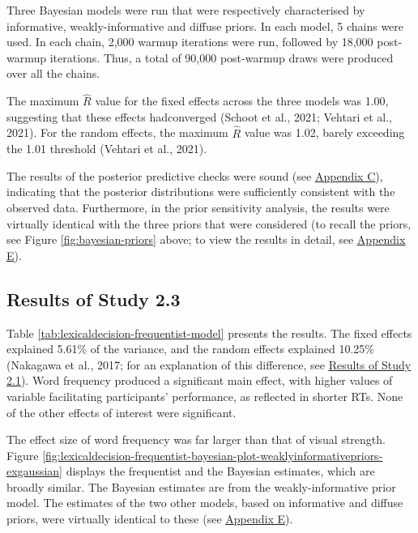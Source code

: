 \documentclass[
  12pt,
  man,floatsintext]{apa7}
\begin{document}
Three Bayesian models were run that were respectively characterised by informative, weakly-informative and diffuse priors. In each model, 5 chains were used. In each chain, 2,000 warmup iterations were run, followed by 18,000 post-warmup iterations. Thus, a total of 90,000 post-warmup draws were produced over all the chains.

The maximum \(\widehat R\) value for the fixed effects across the three models was 1.00, suggesting that these effects hadconverged (Schoot et al., 2021; Vehtari et al., 2021). For the random effects, the maximum \(\widehat R\) value was 1.02, barely exceeding the 1.01 threshold (Vehtari et al., 2021).

The results of the posterior predictive checks were sound (see \protect\hyperlink{appendix-C-Bayesian-analysis-diagnostics}{\underline{Appendix C}}), indicating that the posterior distributions were sufficiently consistent with the observed data. Furthermore, in the prior sensitivity analysis, the results were virtually identical with the three priors that were considered (to recall the priors, see Figure \ref{fig:bayesian-priors} above; to view the results in detail, see \protect\hyperlink{appendix-E-Bayesian-analysis-results}{\underline{Appendix E}}).

\hypertarget{results-of-study-2.3}{%
\subsection{Results of Study 2.3}\label{results-of-study-2.3}}

Table \ref{tab:lexicaldecision-frequentist-model} presents the results. The fixed effects explained 5.61\% of the variance, and the random effects explained 10.25\% (Nakagawa et al., 2017; for an explanation of this difference, see \protect\hyperlink{semanticpriming-results}{\underline{Results of Study 2.1}}). Word frequency produced a significant main effect, with higher values of variable facilitating participants' performance, as reflected in shorter RTs. None of the other effects of interest were significant.

The effect size of word frequency was far larger than that of visual strength. Figure \ref{fig:lexicaldecision-frequentist-bayesian-plot-weaklyinformativepriors-exgaussian} displays the frequentist and the Bayesian estimates, which are broadly similar. The Bayesian estimates are from the weakly-informative prior model. The estimates of the two other models, based on informative and diffuse priors, were virtually identical to these (see \protect\hyperlink{appendix-E-Bayesian-analysis-results}{\underline{Appendix E}}).
\end{document}
